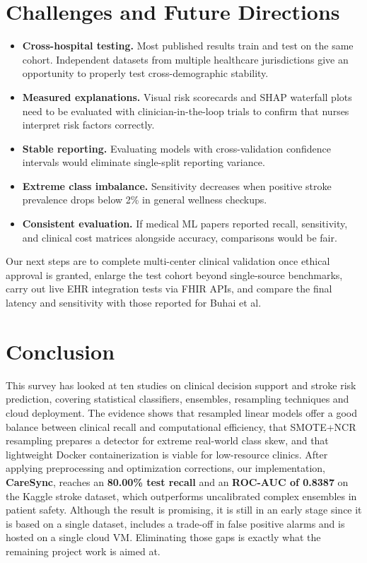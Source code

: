 \documentclass[10pt,journal,compsoc]{IEEEtran}
\begin{document}
\section{Challenges and Future Directions}
\begin{itemize}
    \item \textbf{Cross-hospital testing.} Most published results train and test on the same cohort. Independent datasets from multiple healthcare jurisdictions give an opportunity to properly test cross-demographic stability.
    \item \textbf{Measured explanations.} Visual risk scorecards and SHAP waterfall plots need to be evaluated with clinician-in-the-loop trials to confirm that nurses interpret risk factors correctly.
    \item \textbf{Stable reporting.} Evaluating models with cross-validation confidence intervals would eliminate single-split reporting variance.
    \item \textbf{Extreme class imbalance.} Sensitivity decreases when positive stroke prevalence drops below 2\% in general wellness checkups.
    \item \textbf{Consistent evaluation.} If medical ML papers reported recall, sensitivity, and clinical cost matrices alongside accuracy, comparisons would be fair.
\end{itemize}
Our next steps are to complete multi-center clinical validation once ethical approval is granted, enlarge the test cohort beyond single-source benchmarks, carry out live EHR integration tests via FHIR APIs, and compare the final latency and sensitivity with those reported for Buhai et al.

\section{Conclusion}
This survey has looked at ten studies on clinical decision support and stroke risk prediction, covering statistical classifiers, ensembles, resampling techniques and cloud deployment. The evidence shows that resampled linear models offer a good balance between clinical recall and computational efficiency, that SMOTE+NCR resampling prepares a detector for extreme real-world class skew, and that lightweight Docker containerization is viable for low-resource clinics. After applying preprocessing and optimization corrections, our implementation, \textbf{CareSync}, reaches an \textbf{80.00\% test recall} and an \textbf{ROC-AUC of 0.8387} on the Kaggle stroke dataset, which outperforms uncalibrated complex ensembles in patient safety. Although the result is promising, it is still in an early stage since it is based on a single dataset, includes a trade-off in false positive alarms and is hosted on a single cloud VM. Eliminating those gaps is exactly what the remaining project work is aimed at.
\end{document}
